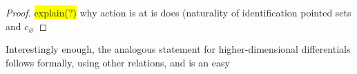 \documentclass[10pt, a4paper, UKenglish]{article}
\numberwithin{equation}{section}
\renewcommand{\subset}{\subseteq}
\newcommand{\comm}[1]{\colorbox{yellow}{#1}}
\theoremstyle{plain}
\theoremstyle{definition}
\renewcommand{\mapsto}{\longmapsto}
\newcommand{\operator}[1]{\mathop{\vphantom{\sum}\mathchoice
{\vcenter{\hbox{\Large $#1$}}}
{\vcenter{\hbox{\large $#1$}}}{#1}{#1}}\displaylimits}
\newcommand{\loday}{\operator{\Lambda}}
\begin{document}
\begin{proof}
%
%
%
%
%
%
%
%
%
%
%
%
%
%
%
\comm{explain(?)} why action is at is does (naturality of identification pointed sets and $c_\varnothing$
%
%
\end{proof}
Interestingly enough, the analogous statement for higher-dimensional differentials follows formally, using other relations, and is an easy
\end{document}
